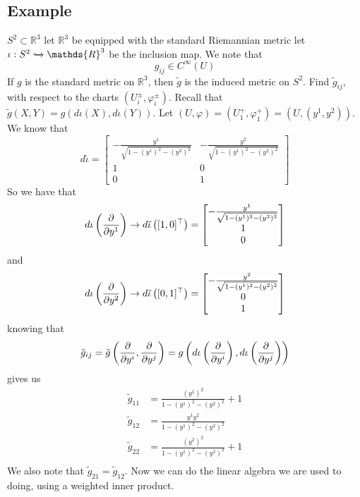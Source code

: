 \documentclass[a4paper]{article}
\begin{document}
\subsection*{Example}%
$S^2 \subset \mathds{R}^3$ let $\mathds{R}^3$ be equipped with the standard Riemannian metric let $\iota: S^2 \xhookrightarrow{} \mathds{R}^3$ be the inclusion map. We note that 
\[
  g_{ij} \in C^{\infty}(U)
\]
If $g$ is the standard metric on $\mathds{R}^3$, then $\tilde{g}$ is the induced metric on $S^2$. Find $\tilde{g}_{ij}$, with respect to the charts $(U_i^\pm, \varphi_i^\pm)$. Recall that $\tilde{g}(X,Y) = g(d \iota(X), d\iota(Y))$. Let $(U,\varphi) = (U_1^+, \varphi_1^+) = (U, (y^1, y^2))$. We know that 
\[
  d \tilde{\iota} = 
  \begin{bmatrix}
    -\frac{y^1}{\sqrt{1 - (y^1)^2 - (y^2)^2}} & -\frac{y^2}{\sqrt{1 - (y^1)^2 - (y^2)^2}}  \\
    1 & 0 \\
    0 & 1
  \end{bmatrix}
\]
So we have that
\[
  d\iota \left( \pdv{}{y^1}\right) \rightarrow d \tilde{\iota} \left( [1, 0]^\top \right) =
  \begin{bmatrix}
    -\frac{y^1}{\sqrt{1 - (y^1)^2 - (y^2)^2}}  \\
    1 \\
    0
  \end{bmatrix}
\]
and 
\[
  d\iota \left( \pdv{}{y^2}\right) \rightarrow d \tilde{\iota} \left( [0, 1]^\top \right) =
  \begin{bmatrix}
    -\frac{y^2}{\sqrt{1 - (y^1)^2 - (y^2)^2}}  \\
    0 \\
    1
  \end{bmatrix}
\]
knowing that 
\[
  \begin{aligned}
    \tilde{g}_{ij} &= \tilde{g} \left( \pdv{}{y^i}, \pdv{}{y^j} \right) = g\left(d \iota \left( \pdv{}{y^i}\right), d \iota \left( \pdv{}{y^j} \right) \right) \\
  \end{aligned}
\]
gives us
\[
  \begin{aligned}
    \tilde{g}_{11} &= \frac{(y^1)^2}{1 - (y^1)^2 - (y^2)^2} + 1 \\
    \tilde{g}_{12} &= \frac{y^1y^2}{1 - (y^1)^2 - (y^2)^2}\\
    \tilde{g}_{22} &= \frac{(y^2)^2}{1 - (y^1)^2 - (y^2)^2} + 1 \\
  \end{aligned}
\]
We also note that $\tilde{g}_{21} = \tilde{g}_{12}$. Now we can do the linear algebra we are used to doing, using a weighted inner product.
\end{document}
